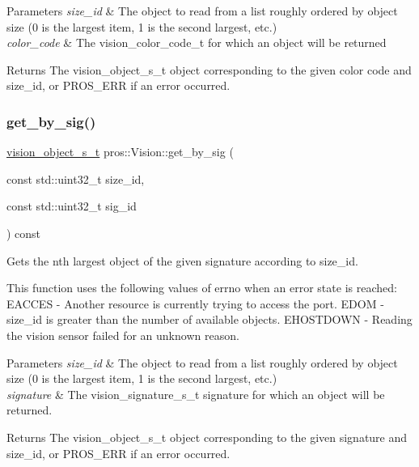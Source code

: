 \begin{DoxyParams}{Parameters}
{\em size\+\_\+id} & The object to read from a list roughly ordered by object size (0 is the largest item, 1 is the second largest, etc.) \\
\hline
{\em color\+\_\+code} & The vision\+\_\+color\+\_\+code\+\_\+t for which an object will be returned\\
\hline
\end{DoxyParams}
\begin{DoxyReturn}{Returns}
The vision\+\_\+object\+\_\+s\+\_\+t object corresponding to the given color code and size\+\_\+id, or P\+R\+O\+S\+\_\+\+E\+RR if an error occurred. 
\end{DoxyReturn}
\mbox{\label{classpros_1_1Vision_a10fd89ed3c5e8fe5ce25046a877c7d84}} 
\subsubsection{\texorpdfstring{get\_by\_sig()}{get\_by\_sig()}}
{\footnotesize\ttfamily \mbox{\hyperlink{vision_8h_ae619120558539c13e53b5a6f42fb4375}{vision\+\_\+object\+\_\+s\+\_\+t}} pros\+::\+Vision\+::get\+\_\+by\+\_\+sig (\begin{DoxyParamCaption}\item[{const std\+::uint32\+\_\+t}]{size\+\_\+id,  }\item[{const std\+::uint32\+\_\+t}]{sig\+\_\+id }\end{DoxyParamCaption}) const}



Gets the nth largest object of the given signature according to size\+\_\+id. 

This function uses the following values of errno when an error state is reached\+: E\+A\+C\+C\+ES -\/ Another resource is currently trying to access the port. E\+D\+OM -\/ size\+\_\+id is greater than the number of available objects. E\+H\+O\+S\+T\+D\+O\+WN -\/ Reading the vision sensor failed for an unknown reason.


\begin{DoxyParams}{Parameters}
{\em size\+\_\+id} & The object to read from a list roughly ordered by object size (0 is the largest item, 1 is the second largest, etc.) \\
\hline
{\em signature} & The vision\+\_\+signature\+\_\+s\+\_\+t signature for which an object will be returned.\\
\hline
\end{DoxyParams}
\begin{DoxyReturn}{Returns}
The vision\+\_\+object\+\_\+s\+\_\+t object corresponding to the given signature and size\+\_\+id, or P\+R\+O\+S\+\_\+\+E\+RR if an error occurred. 
\end{DoxyReturn}
\mbox{\label{classpros_1_1Vision_aa5cca450a5b80278a97bbea786195733}} 
